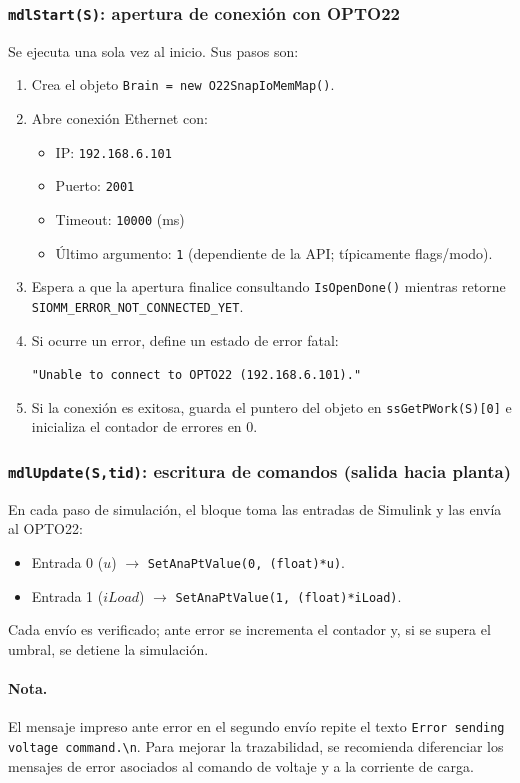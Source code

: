 \subsubsection{\texttt{mdlStart(S)}: apertura de conexión con OPTO22}
Se ejecuta una sola vez al inicio. Sus pasos son:
\begin{enumerate}
    \item Crea el objeto \texttt{Brain = new O22SnapIoMemMap()}.
    \item Abre conexión Ethernet con:
    \begin{itemize}
        \item IP: \texttt{192.168.6.101}
        \item Puerto: \texttt{2001}
        \item Timeout: \texttt{10000} (ms)
        \item Último argumento: \texttt{1} (dependiente de la API; típicamente flags/modo).
    \end{itemize}
    \item Espera a que la apertura finalice consultando \texttt{IsOpenDone()} mientras retorne \texttt{SIOMM\_ERROR\_NOT\_CONNECTED\_YET}.
    \item Si ocurre un error, define un estado de error fatal:
    \begin{center}
        \texttt{"Unable to connect to OPTO22 (192.168.6.101)."}
    \end{center}
    \item Si la conexión es exitosa, guarda el puntero del objeto en \texttt{ssGetPWork(S)[0]} e inicializa el contador de errores en 0.
\end{enumerate}

\subsubsection{\texttt{mdlUpdate(S,tid)}: escritura de comandos (salida hacia planta)}
En cada paso de simulación, el bloque toma las entradas de Simulink y las envía al OPTO22:
\begin{itemize}
    \item Entrada 0 ($u$) $\rightarrow$ \texttt{SetAnaPtValue(0, (float)*u)}.
    \item Entrada 1 ($iLoad$) $\rightarrow$ \texttt{SetAnaPtValue(1, (float)*iLoad)}.
\end{itemize}
Cada envío es verificado; ante error se incrementa el contador y, si se supera el umbral, se detiene la simulación.

\paragraph{Nota.}
El mensaje impreso ante error en el segundo envío repite el texto \texttt{Error sending voltage command.\textbackslash n}. Para mejorar la trazabilidad, se recomienda diferenciar los mensajes de error asociados al comando de voltaje y a la corriente de carga.

